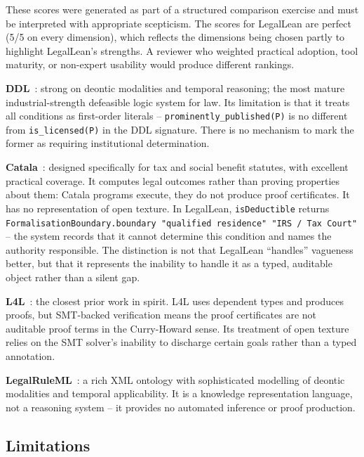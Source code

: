 \documentclass[runningheads]{llncs}
\begin{document}
These scores were generated as part of a structured comparison exercise and must
be interpreted with appropriate scepticism. The scores for LegalLean are perfect
(5/5 on every dimension), which reflects the dimensions being chosen partly to
highlight LegalLean's strengths. A reviewer who weighted practical adoption, tool
maturity, or non-expert usability would produce different rankings.

\textbf{DDL}~\cite{governatori2005representing,governatori2019compliance}: strong
on deontic modalities and temporal reasoning; the most mature industrial-strength
defeasible logic system for law. Its limitation is that it treats all conditions
as first-order literals -- \texttt{prominently\_published(P)} is no different
from \texttt{is\_licensed(P)} in the DDL signature. There is no mechanism to
mark the former as requiring institutional determination.

\textbf{Catala}~\cite{merigoux2021catala}: designed specifically for tax and
social benefit statutes, with excellent practical coverage. It computes legal
outcomes rather than proving properties about them: Catala programs execute, they
do not produce proof certificates. It has no representation of open texture. In
LegalLean, \texttt{isDeductible} returns
\texttt{FormalisationBoundary.boundary~"qualified~residence"~"IRS~/~Tax~Court"}
-- the system records that it cannot determine this condition and names the
authority responsible. The distinction is not that LegalLean ``handles''
vagueness better, but that it represents the inability to handle it as a typed,
auditable object rather than a silent gap.

\textbf{L4L}~\cite{hou2021l4l}: the closest prior work in spirit. L4L uses
dependent types and produces proofs, but SMT-backed verification means the proof
certificates are not auditable proof terms in the Curry-Howard sense. Its
treatment of open texture relies on the SMT solver's inability to discharge
certain goals rather than a typed annotation.

\textbf{LegalRuleML}~\cite{palmirani2018modelling}: a rich XML ontology with
sophisticated modelling of deontic modalities and temporal applicability. It is a
knowledge representation language, not a reasoning system -- it provides no
automated inference or proof production.

\subsection{Limitations}
\end{document}
